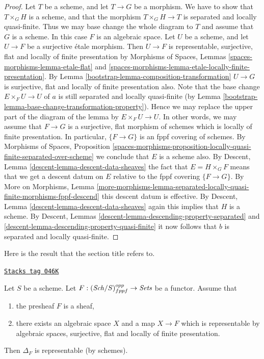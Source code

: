 \begin{proof}

Let $T$ be a scheme, and let $T \to G$ be a morphism.
We have to show that $T \times_G H$ is a scheme, and that
the morphism $T \times_G H \to T$ is separated and
locally quasi-finite. Thus we may base change the whole diagram to $T$
and assume that $G$ is a scheme. In this case $F$ is an algebraic space.
Let $U$ be a scheme, and let $U \to F$ be a surjective \'etale morphism.
Then $U \to F$ is representable, surjective, flat and
locally of finite presentation by
Morphisms of Spaces,
Lemmas \ref{spaces-morphisms-lemma-etale-flat} and
\ref{spaces-morphisms-lemma-etale-locally-finite-presentation}.
By
Lemma \ref{bootstrap-lemma-composition-transformation}
$U \to G$ is surjective, flat and locally of finite presentation also.
Note that the base change $E \times_F U \to U$ of $a$ is still
separated and locally quasi-finite (by
Lemma \ref{bootstrap-lemma-base-change-transformation-property}). Hence we
may replace the upper part of the diagram of the lemma by
$E \times_F U \to U$. In other words, we may assume that
$F \to G$ is a surjective, flat morphism of schemes
which is locally of finite presentation.
In particular, $\{F \to G\}$ is an fppf covering of schemes.
By
Morphisms of Spaces, Proposition
\ref{spaces-morphisms-proposition-locally-quasi-finite-separated-over-scheme}
we conclude that $E$ is a scheme also.
By
Descent, Lemma \ref{descent-lemma-descent-data-sheaves}
the fact that $E = H \times_G F$ means that we get a descent datum
on $E$ relative to the fppf covering $\{F \to G\}$.
By
More on Morphisms, Lemma
\ref{more-morphisms-lemma-separated-locally-quasi-finite-morphisms-fppf-descend}
this descent datum is effective.
By
Descent, Lemma \ref{descent-lemma-descent-data-sheaves}
again this implies that $H$ is a scheme.
By
Descent, Lemmas \ref{descent-lemma-descending-property-separated} and
\ref{descent-lemma-descending-property-quasi-finite}
it now follows that $b$ is separated and locally quasi-finite.
\end{proof}

Here is the result that the section title refers to.

\begin{lemma}
\label{bootstrap-lemma-bootstrap-diagonal}
\href{https://stacks.math.columbia.edu/tag/046K}{\texttt{Stacks tag 046K}}

Let $S$ be a scheme.
Let $F : (\mathit{Sch}/S)_{fppf}^{opp} \to \textit{Sets}$ be a functor.
Assume that
\begin{enumerate}
\item the presheaf $F$ is a sheaf,
\item there exists an algebraic space $X$ and a map $X \to F$
which is representable by algebraic spaces, surjective, flat and
locally of finite presentation.
\end{enumerate}
Then $\Delta_F$ is representable (by schemes).
\end{lemma}

